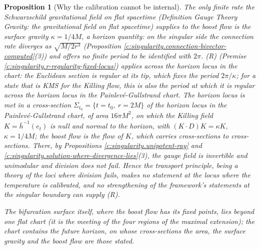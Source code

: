 \documentclass[11pt]{article}
\newtheorem{proposition}[theorem]{Proposition}
\theoremstyle{definition}
\theoremstyle{plain}
\newcommand{\changedmark}[2]{\marginpar{\raggedright\scriptsize\color{#1}#2}}
\providecommand{\hb}{}\renewcommand{\hb}{\bar{h}}
\begin{document}
\begin{proposition}[Why the calibration cannot be internal]\label{c:singularity.why-calibration-cannot-be-internal}
\changedmark{BrickRed}{corrected since the deposit}
The only finite rate the Schwarzschild gravitational field on flat spacetime (Definition \emph{Gauge Theory Gravity: the gravitational field on flat spacetime}) supplies to the boost flow is the surface gravity $\kappa = 1/4M$, a horizon quantity: on the singular side the connection rate diverges as $\sqrt{M/2r^{3}}$ (Proposition \ref{c:singularity.connection-bivector-computed}(3)) and offers no finite period to be identified with $2\pi$. (R) (Premise \ref{c:singularity.r-regularity-fixed-locus}) applies across the horizon locus in the chart: the Euclidean section is regular at its tip, which fixes the period $2\pi/\kappa$; for a state that is KMS for the Killing flow, this is also the period at which it is regular across the horizon locus in the Painlev\'e-Gullstrand chart. The horizon locus is met in a cross-section $\Sigma_{t_0} = \{t = t_0,\ r = 2M\}$ of the horizon locus in the Painlev\'e-Gullstrand chart, of area $16\pi M^{2}$, on which the Killing field $K = \hb^{-1}(e_t)$ is null and normal to the horizon, with $(K \cdot D)K = \kappa K$, $\kappa = 1/4M$; the boost flow is the flow of $K$, which carries cross-sections to cross-sections. There, by Propositions \ref{c:singularity.unipotent-ray} and \ref{c:singularity.solution-where-divergence-lies}(3), the gauge field is invertible and unimodular and division does not fail. Hence the transport principle, being a theory of the loci where division fails, makes no statement at the locus where the temperature is calibrated, and no strengthening of the framework's statements at the singular boundary can supply (R).

The bifurcation surface itself, where the boost flow has its fixed points, lies beyond one flat chart (it is the meeting of the four regions of the maximal extension); the chart contains the future horizon, on whose cross-sections the area, the surface gravity and the boost flow are those stated.
\end{proposition}
\end{document}
